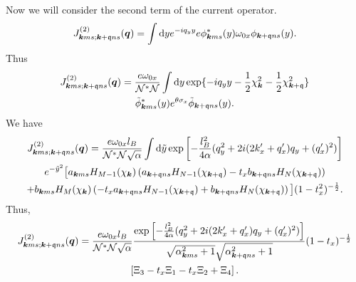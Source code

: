 Now we will consider the second term of the current operator.
\begin{equation}
  \label{eq:37}
  J_{\bm{k} m s; \bm{k} + \mathfrak{q} n s}^{(2)} (\bm{q}) =
  \int \mathrm{d} y
  e^{-iq_{y} y} e
  \phi ^{*}_{\bm{k} m s}(y) \omega _{0 x} \phi _{\bm{k} + \mathfrak{q} n s}(y).
\end{equation}
Thus
\begin{multline}
  \label{eq:38}
  J_{\bm{k} m s; \bm{k} + \mathfrak{q} n s}^{(2)} (\bm{q}) =
  \frac{e \omega _{0 x}}{\mathcal{N}^{*} \mathcal{N}}
  \int \mathrm{d} y
  \exp\{-i q_{y} y - \frac{1}{2} \chi_{\bm{k}} ^2 - \frac{1}{2} \chi _{\bm{k} + \mathfrak{q}}^2\} \\
  \tilde{\phi} ^{*}_{\bm{k} m s}(y) e^{\theta \sigma _{x}} \tilde{\phi} _{\bm{k} + \mathfrak{q} n s}(y).
\end{multline}
We have
\begin{multline}
  \label{eq:39}
  J_{\bm{k} m s; \bm{k} + \mathfrak{q} n s}^{(2)} (\bm{q}) =
  \frac{e \omega _{0 x} l_{B}}{\mathcal{N}^{*} \mathcal{N} \sqrt{\alpha}}
  \int \mathrm{d} \tilde{y}
    \exp \left[
      -\frac{l_{B}^2}{4 \alpha } (q_{y}^2 + 2i (2 k'_x + q' _x) q_{y}  + (q'_x)^2 )
    \right]\\
  e^{-\tilde{y}^2} \big[
    a_{\bm{k} m s} H_{M-1}( \chi _{\bm{k}} ) \left(a_{\bm{k} + \mathfrak{q} n s} H_{N-1}( \chi _{\bm{k} + \mathfrak{q}} ) - t_{x} b_{\bm{k} + \mathfrak{q} n s} H_{N}( \chi _{\bm{k} + \mathfrak{q}} ) \right)\\
   +
    b_{\bm{k} m s} H_{M}( \chi _{\bm{k}} ) \left(-t_{x} a_{\bm{k} + \mathfrak{q} n s} H_{N-1}( \chi _{\bm{k} + \mathfrak{q}} ) + b_{\bm{k} + \mathfrak{q} n s} H_{N}( \chi _{\bm{k} + \mathfrak{q}} ) \right)
    \big]
    (1 - t_{x}^2)^{-\frac{1}{2}}.
\end{multline}
Thus,
\begin{multline}
  J_{\bm{k} m s; \bm{k} + \mathfrak{q} n s}^{(2)} (\bm{q}) =
  \frac{e \omega _{0 x} l_{B}}{\mathcal{N}^{*} \mathcal{N} \sqrt{\alpha } }
  \frac{
    \exp \left[
      -\frac{l_{B}^2}{4 \alpha } (q_{y}^2 + 2i (2 k' _x + q' _x) q_{y} + (q'_x)^2 )
    \right]
  }{
    \sqrt{\alpha_{\bm{k} m s}^2 + 1} \sqrt{\alpha _{\bm{k}+\mathfrak{q} n s}^2 + 1}
  }
  (1-t_{x})^{-\frac{1}{2}}\\
  \left[
    \Xi _{3} - t_{x} \Xi _{1}
    - t_{x} \Xi _{2} + \Xi_{4}
  \right].
\end{multline}


